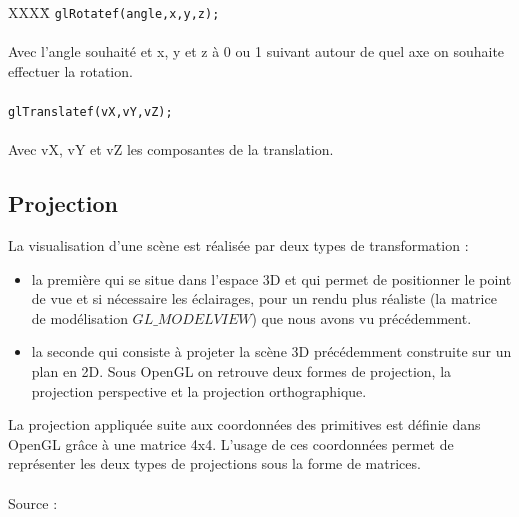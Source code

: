 \begin{tabbing}
XXXX\= \kill
\> \verb|glRotatef(angle,x,y,z);| \\\\
Avec l'angle souhaité et x, y et z à 0 ou 1 suivant autour de quel axe on souhaite\\ effectuer la rotation.\\\\
\> \verb|glTranslatef(vX,vY,vZ);|\\\\
Avec vX, vY et vZ les composantes de la translation. 
\end{tabbing}

\subsection{Projection}

La visualisation d'une scène est réalisée par deux types de transformation :

\begin{itemize}
	\item la première qui se situe dans l'espace 3D et qui permet de positionner le point de vue et si nécessaire les éclairages, pour un rendu plus réaliste (la matrice de modélisation $GL\_MODELVIEW$) que nous avons vu précédemment.

	\item la seconde qui consiste à projeter la scène 3D précédemment construite sur un plan en 2D. Sous OpenGL on retrouve deux formes de projection, la projection perspective et la projection orthographique.
\end{itemize}

La projection appliquée suite aux coordonnées des primitives est définie dans OpenGL grâce à une matrice 4x4. L'usage de ces coordonnées permet de représenter les deux types de projections sous la forme de matrices. \\\\
Source : \cite{PdfOpenGL}

